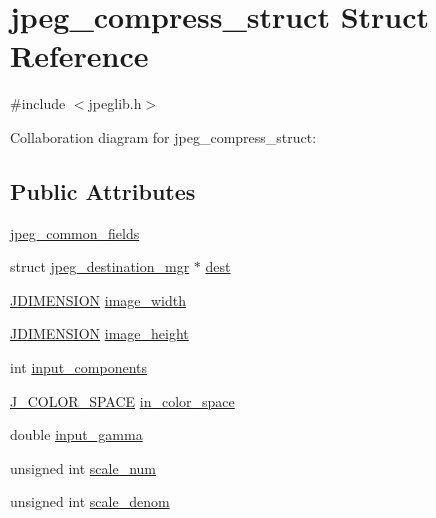 \hypertarget{structjpeg__compress__struct}{}\section{jpeg\+\_\+compress\+\_\+struct Struct Reference}
\label{structjpeg__compress__struct}


{\ttfamily \#include $<$jpeglib.\+h$>$}



Collaboration diagram for jpeg\+\_\+compress\+\_\+struct\+:
\subsection*{Public Attributes}
\begin{DoxyCompactItemize}
\item 
\mbox{\hyperlink{structjpeg__compress__struct_a831013770bec36f77dd2048c8771513c}{jpeg\+\_\+common\+\_\+fields}}
\item 
struct \mbox{\hyperlink{structjpeg__destination__mgr}{jpeg\+\_\+destination\+\_\+mgr}} $\ast$ \mbox{\hyperlink{structjpeg__compress__struct_ab31c2c756e309dee8d0318557353ba40}{dest}}
\item 
\mbox{\hyperlink{jmorecfg_8h_a04ed4674f6f1d0d50ec241531e38274f}{J\+D\+I\+M\+E\+N\+S\+I\+ON}} \mbox{\hyperlink{structjpeg__compress__struct_ac8e50a2c70252c53f3e10b886818f2cf}{image\+\_\+width}}
\item 
\mbox{\hyperlink{jmorecfg_8h_a04ed4674f6f1d0d50ec241531e38274f}{J\+D\+I\+M\+E\+N\+S\+I\+ON}} \mbox{\hyperlink{structjpeg__compress__struct_a30863835e7785b7df800811f842b2da0}{image\+\_\+height}}
\item 
int \mbox{\hyperlink{structjpeg__compress__struct_af5b66b039ea5a96bb2f5cf0254115837}{input\+\_\+components}}
\item 
\mbox{\hyperlink{jpeglib_8h_a6ea40239360b06efe6377f125f1134f3}{J\+\_\+\+C\+O\+L\+O\+R\+\_\+\+S\+P\+A\+CE}} \mbox{\hyperlink{structjpeg__compress__struct_ac27d1dfbbbd677aab9fb570c58ca960d}{in\+\_\+color\+\_\+space}}
\item 
double \mbox{\hyperlink{structjpeg__compress__struct_ac5d2e16382ea12fb4e3bd6a69f7831ea}{input\+\_\+gamma}}
\item 
unsigned int \mbox{\hyperlink{structjpeg__compress__struct_a16eb7e2e1ac30c42e8bd753bde43129c}{scale\+\_\+num}}
\item 
unsigned int \mbox{\hyperlink{structjpeg__compress__struct_ab30f569483d6c25032aa2c18c885e91c}{scale\+\_\+denom}}

\end{DoxyCompactItemize}

